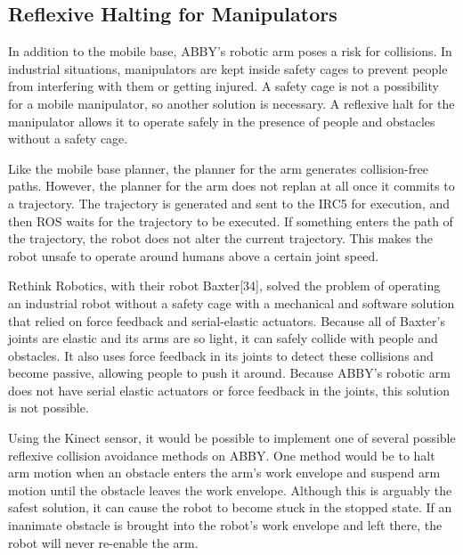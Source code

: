 \documentclass[]{cwru} %
\begin{document}
\subsection{Reflexive Halting for Manipulators}

In addition to the mobile base, ABBY's robotic arm poses a risk for
collisions. In industrial situations, manipulators are kept inside
safety cages to prevent people from interfering with them or getting
injured. A safety cage is not a possibility for a mobile manipulator, so
another solution is necessary. A reflexive halt for the manipulator
allows it to operate safely in the presence of people and obstacles
without a safety cage.

Like the mobile base planner, the planner for the arm generates
collision-free paths. However, the planner for the arm does not replan
at all once it commits to a trajectory. The trajectory is generated and
sent to the IRC5 for execution, and then ROS waits for the trajectory to
be executed. If something enters the path of the trajectory, the robot
does not alter the current trajectory. This makes the robot unsafe to
operate around humans above a certain joint speed.

Rethink Robotics, with their robot Baxter{[}34{]}, solved the problem of
operating an industrial robot without a safety cage with a mechanical
and software solution that relied on force feedback and serial-elastic
actuators. Because all of Baxter's joints are elastic and its arms are
so light, it can safely collide with people and obstacles. It also uses
force feedback in its joints to detect these collisions and become
passive, allowing people to push it around. Because ABBY's robotic arm
does not have serial elastic actuators or force feedback in the joints,
this solution is not possible.

Using the Kinect sensor, it would be possible to implement one of
several possible reflexive collision avoidance methods on ABBY. One
method would be to halt arm motion when an obstacle enters the arm's
work envelope and suspend arm motion until the obstacle leaves the work
envelope. Although this is arguably the safest solution, it can cause
the robot to become stuck in the stopped state. If an inanimate obstacle
is brought into the robot's work envelope and left there, the robot will
never re-enable the arm.
\end{document}
